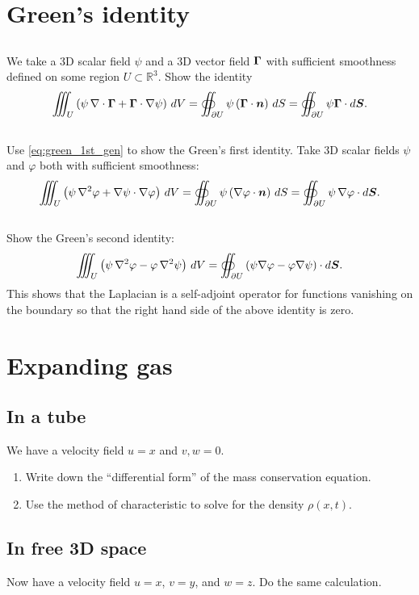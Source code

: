 \documentclass[11pt,letterpaper]{article}
\begin{document}
\section{Green's identity}
\subsection{}
We take a 3D scalar field $\psi$ and a 3D vector field $\boldsymbol{\Gamma}$ with sufficient smoothness defined on some region $U \subset \mathbb{R}^3$. Show the identity
\begin{align}
    \iiint_U \left( \psi \, \nabla \cdot \boldsymbol{\Gamma} + \boldsymbol{\Gamma} \cdot \nabla \psi\right)\, dV  = \oiint_{\partial U} \psi \left( \boldsymbol{\Gamma} \cdot \boldsymbol{n} \right)\, dS=\oiint_{\partial U}\psi\boldsymbol{\Gamma}\cdot d\boldsymbol{S}.\label{eq:green_1st_gen}
\end{align}

\subsection{}
Use \eqref{eq:green_1st_gen} to show the Green's first identity. Take 3D scalar fields $\psi$ and $\varphi$ both with sufficient smoothness:
\begin{align}
    \iiint_U \left( \psi \, \nabla^2 \varphi + \nabla \psi \cdot \nabla \varphi \right)\, dV  = \oiint_{\partial U} \psi \left( \nabla \varphi \cdot \boldsymbol{n} \right)\, dS=\oiint_{\partial U}\psi\,\nabla\varphi\cdot d\boldsymbol{S}.
\end{align}

\subsection{}
Show the Green's second identity:
\begin{align}
    \iiint_U \left( \psi \, \nabla^2 \varphi - \varphi \, \nabla^2 \psi\right)\, dV = \oiint_{\partial U} \left( \psi \nabla \varphi - \varphi \nabla \psi\right)\cdot d\boldsymbol{S}.
\end{align}
This shows that the Laplacian is a self-adjoint operator for functions vanishing on the boundary so that the right hand side of the above identity is zero.


\section{Expanding gas}
\subsection{In a tube}
We have a velocity field $u=x$ and $v,w=0$. 
\begin{enumerate}
    \item Write down the ``differential form'' of the mass conservation equation.
    \item Use the method of characteristic to solve for the density $\rho(x,t)$.
\end{enumerate}

\subsection{In free 3D space}
Now have a velocity field $u=x$, $v=y$, and $w=z$. Do the same calculation.


    
\vfill
\printbibliography
\end{document}
